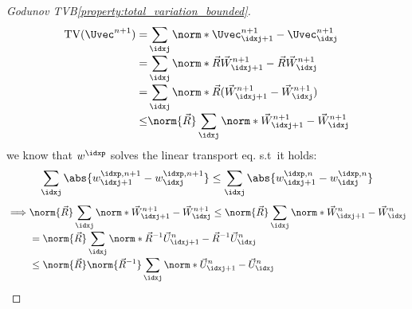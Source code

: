 \begin{proofbox}\nospacing
    \begin{proof}[Godunov TVB\cref{property:total_variation_bounded}]
        \label{proof:property:total_variation_bounded}
        \begin{align*}
          \text{TV}(\Uvec^{n+1})=&\sum_{\idxj}\norm*{\Uvec_{\idxj+1}^{n+1}-\Uvec_{\idxj}^{n+1}}\\[-1\jot]
          =&\sum_{\idxj}\norm*{\vec{R}\vec{W}_{\idxj+1}^{n+1}-\vec{R}\vec{W}_{\idxj}^{n+1}}\\[-1\jot]
              =&\sum_{\idxj}\norm*{\vec{R}(\vec{W}_{\idxj+1}^{n+1}-\vec{W}_{\idxj}^{n+1})}\\[-1\jot]
              \leq&\norm{\vec{R}}\sum_{\idxj}\norm*{\vec{W}_{\idxj+1}^{n+1}-\vec{W}_{\idxj}^{n+1}}
        \end{align*}
        we know that $w^{\idxp}$ solves the linear transport eq. s.t\ it holds:
        \begin{align*}
          \sum_{\idxj}\abs{w_{\idxj+1}^{\idxp,n+1}-w_{\idxj}^{\idxp,n+1}}
          \leq\sum_{\idxj}\abs{w_{\idxj+1}^{\idxp,n}-w_{\idxj}^{\idxp,n}}
        \end{align*}
        \begin{align*}
         \implies&\norm{\vec{R}}\sum_{\idxj}\norm*{\vec{W}_{\idxj+1}^{n+1}-\vec{W}_{\idxj}^{n+1}}\leq
        \norm{\vec{R}}\sum_{\idxj}\norm*{\vec{W}_{\idxj+1}^{n}-\vec{W}_{\idxj}^{n}}\\[-1\jot]
        &=\norm{\vec{R}}\sum_{\idxj}\norm*{\vec{R}^{-1}\vec{U}_{\idxj+1}^{n}-\vec{R}^{-1}\vec{U}_{\idxj}^{n}}\\[-1\jot]
        &\leq\norm{\vec{R}}\norm{\vec{R}^{-1}}\sum_{\idxj}\norm*{\vec{U}_{\idxj+1}^{n}-\vec{U}_{\idxj}^{n}}
        \end{align*}
    \end{proof}
\end{proofbox}

